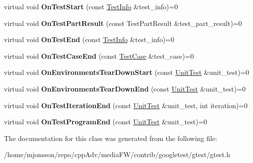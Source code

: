 \begin{DoxyCompactItemize}
virtual void {\bfseries On\+Test\+Start} (const \hyperlink{classtesting_1_1TestInfo}{Test\+Info} \&test\+\_\+info)=0
\item 
\mbox{\label{classtesting_1_1TestEventListener_a054f8705c883fa120b91473aff38f2ee}} 
virtual void {\bfseries On\+Test\+Part\+Result} (const Test\+Part\+Result \&test\+\_\+part\+\_\+result)=0
\item 
\mbox{\label{classtesting_1_1TestEventListener_abb1c44525ef038500608b5dc2f17099b}} 
virtual void {\bfseries On\+Test\+End} (const \hyperlink{classtesting_1_1TestInfo}{Test\+Info} \&test\+\_\+info)=0
\item 
\mbox{\label{classtesting_1_1TestEventListener_ae61985e2ef76ac78379b077be57a9c36}} 
virtual void {\bfseries On\+Test\+Case\+End} (const \hyperlink{classtesting_1_1TestCase}{Test\+Case} \&test\+\_\+case)=0
\item 
\mbox{\label{classtesting_1_1TestEventListener_a468b5e6701bcb86cb2c956caadbba5e4}} 
virtual void {\bfseries On\+Environments\+Tear\+Down\+Start} (const \hyperlink{classtesting_1_1UnitTest}{Unit\+Test} \&unit\+\_\+test)=0
\item 
\mbox{\label{classtesting_1_1TestEventListener_a9ea04fa7f447865ba76df35e12ba2092}} 
virtual void {\bfseries On\+Environments\+Tear\+Down\+End} (const \hyperlink{classtesting_1_1UnitTest}{Unit\+Test} \&unit\+\_\+test)=0
\item 
\mbox{\label{classtesting_1_1TestEventListener_a550fdb3e55726e4cefa09f5697941425}} 
virtual void {\bfseries On\+Test\+Iteration\+End} (const \hyperlink{classtesting_1_1UnitTest}{Unit\+Test} \&unit\+\_\+test, int iteration)=0
\item 
\mbox{\label{classtesting_1_1TestEventListener_ad15b6246d94c268e233487a86463ef3d}} 
virtual void {\bfseries On\+Test\+Program\+End} (const \hyperlink{classtesting_1_1UnitTest}{Unit\+Test} \&unit\+\_\+test)=0
\end{DoxyCompactItemize}


The documentation for this class was generated from the following file\+:\begin{DoxyCompactItemize}
\item 
/home/mjonsson/repo/cpp\+Adv/media\+F\+W/contrib/googletest/gtest/gtest.\+h\end{DoxyCompactItemize}
